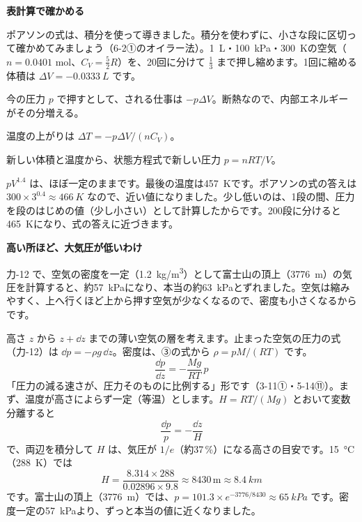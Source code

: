 \noindent\textbf{表計算で確かめる}\par\nobreak
ポアソンの式は、積分を使って導きました。積分を使わずに、小さな段に区切って確かめてみましょう（6-2①のオイラー法）。\qty{1}{L}・\qty{100}{kPa}・\qty{300}{K}の空気（$n=0.0401$ mol、$C_V=\tfrac{5}{2}R$）を、20回に分けて $\tfrac13$ まで押し縮めます。1回に縮める体積は $\Delta V=-\qty{0.0333}{L}$ です。
\begin{enumerate}[label={\bkcircled[bkBlue]{\arabic*}}, leftmargin=2.4\zw, itemsep=2pt, topsep=2pt]
\item 今の圧力 $p$ で押すとして、される仕事は $-p\Delta V$。断熱なので、内部エネルギーがその分増える。
\item 温度の上がりは $\Delta T=-p\Delta V/(nC_V)$。
\item 新しい体積と温度から、状態方程式で新しい圧力 $p=nRT/V$。
\end{enumerate}
\begin{bkcenter}
\end{bkcenter}
$pV^{1.4}$ は、ほぼ一定のままです。最後の温度は\qty{457}{K}です。ポアソンの式の答えは $300\times3^{0.4}\approx\qty{466}{K}$ なので、近い値になりました。少し低いのは、1段の間、圧力を段のはじめの値（少し小さい）として計算したからです。200段に分けると\qty{465}{K}になり、式の答えに近づきます。

\noindent\textbf{高い所ほど、大気圧が低いわけ}\par\nobreak
\label{ph:熱-3:taiki}力-12 で、空気の密度を一定（\qty{1.2}{kg/m^3}）として富士山の頂上（\qty{3776}{m}）の気圧を計算すると、約\qty{57}{kPa}になり、本当の約\qty{63}{kPa}とずれました。空気は縮みやすく、上へ行くほど上から押す空気が少なくなるので、密度も小さくなるからです。

高さ $z$ から $z+\dd z$ までの薄い空気の層を考えます。止まった空気の圧力の式（力-12）は $\dd p=-\rho g\,\dd z$。密度は、③の式から $\rho=pM/(RT)$ です。
\[ \frac{\dd p}{\dd z}=-\frac{Mg}{RT}\,p \]
「圧力の減る速さが、圧力そのものに比例する」形です（3-11①・5-14⑪）。まず、温度が高さによらず一定（等温）とします。$H=RT/(Mg)$ とおいて変数分離すると
\[ \frac{\dd p}{p}=-\frac{\dd z}{H} \]
で、両辺を積分して
$H$ は、気圧が $1/e$（約37\,\%）になる高さの目安です。\qty{15}{\celsius}（\qty{288}{K}）では
\[ H=\frac{8.314\times288}{0.02896\times9.8}\approx\num{8430}\,\mathrm{m}\approx\qty{8.4}{km} \]
です。富士山の頂上（\qty{3776}{m}）では、$p=101.3\times e^{-3776/8430}\approx\qty{65}{kPa}$ です。密度一定の\qty{57}{kPa}より、ずっと本当の値に近くなりました。

